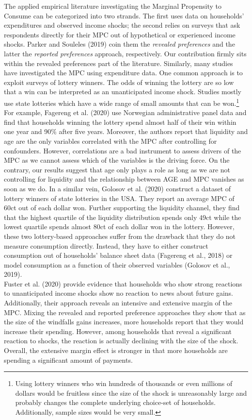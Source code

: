 The applied empirical literature investigating the Marginal Propensity to Consume can be categorized into two strands. The first uses data on households' expenditures and observed income shocks; the second relies on surveys that ask respondents directly for their MPC out of hypothetical or experienced income shocks. Parker and Souleles (2019) coin them the \textit{revealed preferences} and the latter the \textit{reported preferences} approach, respectively. Our contribution firmly sits within the revealed preferences part of the literature. Similarly, many studies have investigated the MPC using expenditure data. One common approach is to exploit surveys of lottery winners. The odds of winning the lottery are so low that a win can be interpreted as an unanticipated income shock. Studies mostly use state lotteries which have a wide range of small amounts that can be won.\footnote{Using lottery winners who win hundreds of thousands or even millions of dollars would be fruitless since the size of the shock is unreasonably large and probably changes the complete underlying choice-set of households. Additionally, sample sizes would be very small.} For example, Fagereng et al. (2020) use Norwegian administrative panel data and find that households winning the lottery spend almost half of their win within one year and 90\% after five years. Moreover, the authors report that liquidity and age are the only variables correlated with the MPC after controlling for confounders. However, correlations are a bad instrument to assess drivers of the MPC as we cannot assess which of the variables is the driving force. On the contrary, our results suggest that age only plays a role as long as we are not controlling for liquidity and the relationship between AGE and MPC vanishes as soon as we do. In a similar vein, Golosov et al. (2020) construct a dataset of lottery winners of state lotteries in the USA. They report an average MPC of 60ct out of each dollar won. Further supporting the liquidity channel, they find that the highest quartile of the liquidity distribution spends only 49ct while the lowest quartile spends almost 80ct of each dollar won in the lottery. However, these two lottery-based approaches suffer from the drawback that they do not measure consumption directly. Instead, they have to either construct consumption out of households' balance sheet data (Fagereng et al., 2018) or model consumption as a function of their observed variables (Golosov et al., 2019). \\
Fuster et al. (2020) provide evidence that households who show strong reactions to unanticipated income shocks show no reaction to news about future gains. Additionally, their approach reveals an intensive and extensive margin of the MPC. Mixing the revealed and reported preference approaches they show that as the size of the windfalls gains increases, more households report that they would increase their spending. However, among households that reveal a significant reaction to shocks, the reaction is actually declining with the size of the shock. Overall, the extensive margin effect is stronger in that more households are spending a significant amount of payments. \\
